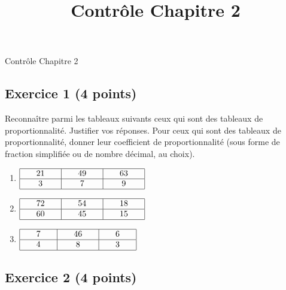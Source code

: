 \documentclass[14 pt]{extarticle}
\title{Contrôle Chapitre 2}
\date{}
\theoremstyle{plain}
\begin{document}
\begin{center}{\Large Contrôle Chapitre 2}\\ 
 \end{center}
 
 
 \subsection*{Exercice 1 (4 points)}

 Reconnaître parmi les tableaux suivants ceux qui sont des tableaux de proportionnalité. Justifier vos réponses. Pour ceux qui sont des tableaux de proportionnalité, donner leur coefficient de proportionnalité (sous forme de fraction simplifiée ou de nombre décimal, au choix). 
 \begin{enumerate}
 \item $\renewcommand{\arraystretch}{1}
\begin{array}{|c|c|c|}
\hline
\phantom{000}21\phantom{000} & \phantom{000}49\phantom{000} & \phantom{000}63\phantom{000}\\
\hline
3 & 7 & 9\\
\hline
\end{array}
\renewcommand{\arraystretch}{1}$

\item $\renewcommand{\arraystretch}{1}
\begin{array}{|c|c|c|}
\hline
\phantom{000}72\phantom{000} & \phantom{000}54\phantom{000} & \phantom{000}18\phantom{000}\\
\hline
60 & 45  & 15\\
\hline
\end{array}
\renewcommand{\arraystretch}{1}$

 \item $\renewcommand{\arraystretch}{1}
\begin{array}{|c|c|c|}
\hline
\phantom{000}7\phantom{000} & \phantom{000}46 \phantom{000} & \phantom{000}6\phantom{000}\\
\hline
4 & 8 & 3\\
\hline
\end{array}
\renewcommand{\arraystretch}{1}$



\end{enumerate}

\subsection*{Exercice 2 (4 points)}
\end{document}
